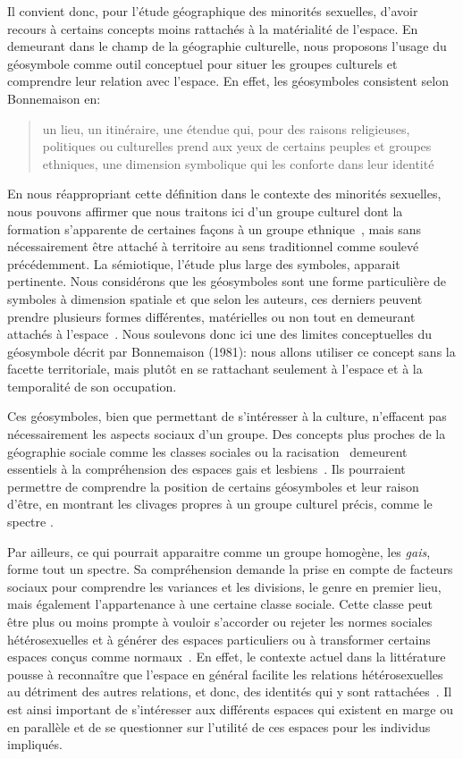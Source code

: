 Il convient donc, pour l'étude géographique des minorités sexuelles, d'avoir recours à certains concepts moins rattachés à la matérialité de l'espace.
En demeurant dans le champ de la géographie culturelle, nous proposons l'usage du géosymbole comme outil conceptuel pour situer les groupes culturels et comprendre leur relation avec l'espace.
En effet, les géosymboles consistent selon Bonnemaison en: \blockquote[{\cite[256]{Bonnemaison1981}}][]{\textelp{} un lieu, un itinéraire, une étendue qui, pour des raisons religieuses, politiques ou  culturelles prend aux yeux de certains peuples et groupes ethniques, une  dimension symbolique qui les conforte dans leur identité}.
En nous réappropriant cette définition dans le contexte des minorités sexuelles, nous pouvons affirmer que nous traitons ici d'un groupe culturel dont la formation s'apparente de certaines façons à un groupe ethnique~\citep{Sinfield1996}, mais sans nécessairement être attaché à territoire au sens traditionnel comme soulevé précédemment.
La sémiotique, l'étude plus large des symboles, apparait pertinente.
Nous considérons que les géosymboles sont une forme particulière de symboles à dimension spatiale et que selon les auteurs, ces derniers peuvent prendre plusieurs formes différentes, matérielles ou non tout en demeurant attachés à l'espace~\citep{Bonnemaison1981,Bedard2002}.
Nous soulevons donc ici une des limites conceptuelles du géosymbole décrit par Bonnemaison (1981): nous allons utiliser ce concept sans la facette territoriale, mais plutôt en se rattachant seulement à l'espace et à la temporalité de son occupation.

Ces géosymboles, bien que permettant de s'intéresser à la culture, n'effacent pas nécessairement les aspects sociaux d'un groupe.
Des concepts plus proches de la géographie sociale comme les classes sociales ou la racisation~\citep{Bonniol2005} demeurent essentiels à la compréhension des espaces gais et lesbiens~\citep[93]{Oswin2008}.
Ils pourraient permettre de comprendre la position de certains géosymboles et leur raison d'être, en montrant les clivages propres à un groupe culturel précis, comme le spectre \lgbt{}.

Par ailleurs, ce qui pourrait apparaitre comme un groupe homogène, les \emph{gais}, forme tout un spectre.
Sa compréhension demande la prise en compte de facteurs sociaux pour comprendre les variances et les divisions, le genre en premier lieu, mais également l'appartenance à une certaine classe sociale.
Cette classe peut être plus ou moins prompte à vouloir s'accorder ou rejeter les normes sociales hétérosexuelles et à générer des espaces particuliers ou à transformer certains espaces conçus comme normaux~\citep{Lewis2011}.
En effet, le contexte actuel dans la littérature pousse à reconnaître que l'espace en général facilite les relations hétérosexuelles au détriment des autres relations, et donc, des identités qui y sont rattachées~\citep{Brown2003}.
Il est ainsi important de s'intéresser aux différents espaces qui existent en marge ou en parallèle et de se questionner sur l'utilité de ces espaces pour les individus impliqués.

